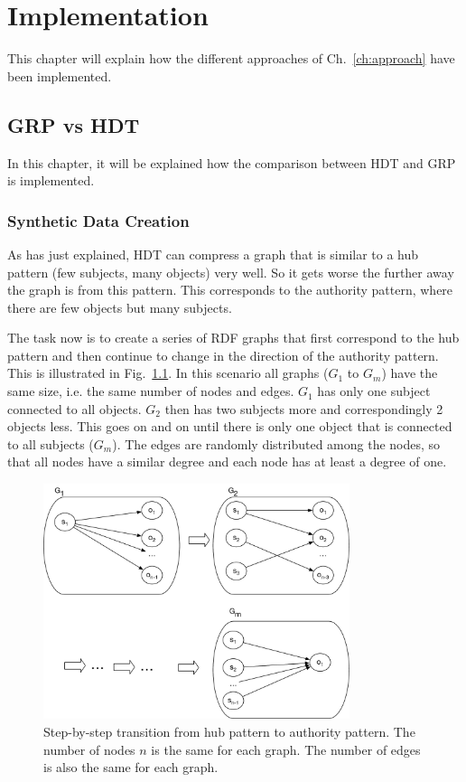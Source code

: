 \chapter{Implementation}\label{ch:implementation}

This chapter will explain how the different approaches of Ch.~\ref{ch:approach} have been implemented.

\section{GRP vs HDT}\label{sec:implementationGRPvsHDT}

In this chapter, it will be explained how the comparison between HDT and GRP is implemented.

\subsection{Synthetic Data Creation}\label{sec:data_creation}

As has just explained, HDT can compress a graph that is similar to a hub pattern (few subjects, many objects) very well. So it gets worse the further away the graph is from this pattern. This corresponds to the authority pattern, where there are few objects but many subjects.

The task now is to create a series of RDF graphs that first correspond to the hub pattern and then continue to change in the direction of the authority pattern. This is illustrated in Fig.~\ref{fig:star_pattern}. In this scenario all graphs ($G_1$ to $G_m$) have the same size, i.e. the same number of nodes and edges. $G_1$ has only one subject connected to all objects. $G_2$ then has two subjects more and correspondingly 2 objects less. This goes on and on until there is only one object that is connected to all subjects ($G_m$). The edges are randomly distributed among the nodes, so that all nodes have a similar degree and each node has at least a degree of one.

\begin{figure}[h]
	\centering
	\includegraphics[width=0.8\textwidth]{figures/GRPvsHDT/starpattern.pdf}
	\caption{Step-by-step transition from hub pattern to authority pattern. The number of nodes $n$ is the same for each graph. The number of edges is also the same for each graph.}
	\label{fig:star_pattern}
\end{figure}

